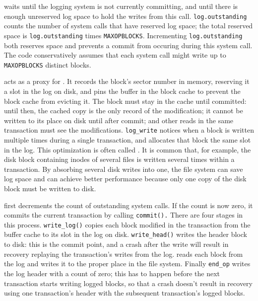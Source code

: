 waits until
the logging system is not currently committing, and until
there is enough unreserved log space to hold
the writes from this call.
\lstinline{log.outstanding}
counts the number of system calls that have reserved log
space; the total reserved space is 
\lstinline{log.outstanding}
times
\lstinline{MAXOPBLOCKS}.
Incrementing
\lstinline{log.outstanding}
both reserves space and prevents a commit
from occuring during this system call.
The code conservatively assumes that each system call might write up to
\lstinline{MAXOPBLOCKS}
distinct blocks.

acts as a proxy for 
.
It records the block's sector number in memory,
reserving it a slot in the log on disk,
and pins the buffer in the block cache
to prevent the block cache from evicting it.
The block must stay in the cache until committed:
until then, the cached copy is the only record
of the modification; it cannot be written to
its place on disk until after commit;
and other reads in the same transaction must
see the modifications.
\lstinline{log_write}
notices when a block is written multiple times during a single
transaction, and allocates that block the same slot in the log.
This optimization is often called
.
It is common that, for example, the disk block containing inodes
of several files is written several times within a transaction.  By absorbing
several disk writes into one, the file system can save log space and
can achieve better performance because only one copy of the disk block must be
written to disk.

first decrements the count of outstanding system calls.
If the count is now zero, it commits the current
transaction by calling
\lstinline{commit().}
There are four stages in this process.
\lstinline{write_log()}
copies each block modified in the transaction from the buffer
cache to its slot in the log on disk.
\lstinline{write_head()}
writes the header block to disk: this is the
commit point, and a crash after the write will
result in recovery replaying the transaction's writes from the log.
reads each block from the log and writes it to the proper
place in the file system.
Finally
\lstinline{end_op}
writes the log header with a count of zero;
this has to happen before the next transaction starts writing
logged blocks, so that a crash doesn't result in recovery
using one transaction's header with the subsequent transaction's
logged blocks.

